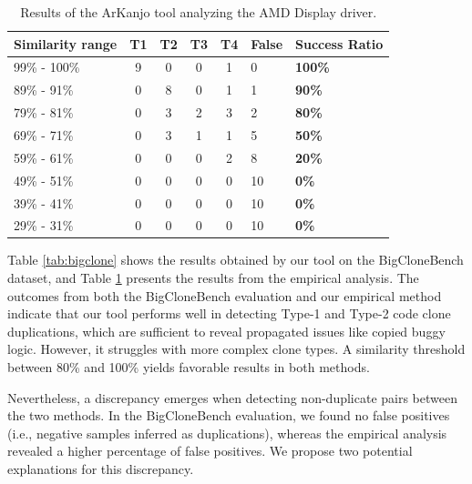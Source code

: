 \documentclass[conference]{IEEEtran}
\begin{document}
\begin{table}[ht]

\centering
\caption{Results of the ArKanjo tool analyzing the AMD Display driver.}
\begin{tabular}{ | m{15mm} | c | c | c | c | m{6mm} | m{10mm} | }

\hline

\textbf{Similarity range} & \textbf{T1} & \textbf{T2} & T3 & T4
& \textbf{False} & \textbf{Success Ratio} \\ \hline
99\% - 100\% & 9 & 0 & 0 & 1 & 0 & \textbf{100\%} \\ \hline
89\% - 91\% & 0 & 8 & 0 & 1 & 1 & \textbf{90\%} \\ \hline
79\% - 81\% & 0 & 3 & 2 & 3 & 2 & \textbf{80\%} \\ \hline
69\% - 71\% & 0 & 3 & 1 & 1 & 5 & \textbf{50\%} \\ \hline
59\% - 61\% & 0 & 0 & 0 & 2 & 8 & \textbf{20\%} \\ \hline
49\% - 51\% & 0 & 0 & 0 & 0 & 10 & \textbf{0\%} \\ \hline
39\% - 41\% & 0 & 0 & 0 & 0 & 10 & \textbf{0\%} \\ \hline
29\% - 31\% & 0 & 0 & 0 & 0 & 10 & \textbf{0\%} \\ \hline

\hline

\end{tabular}

\label{tab:emp}

\end{table}

Table \ref{tab:bigclone} shows the results obtained by our tool on the BigCloneBench dataset,
and Table \ref{tab:emp} presents the results from the empirical analysis.
The outcomes from both the BigCloneBench evaluation and our empirical method indicate that
our tool performs well in detecting Type-1 and Type-2 code clone duplications,
which are sufficient to reveal propagated issues like copied buggy logic.
However, it struggles with more complex clone types. A similarity threshold between 80\% and 100\% 
yields favorable results in both methods.

Nevertheless, a discrepancy emerges when detecting non-duplicate pairs between
the two methods. In the BigCloneBench evaluation, we found no false positives (i.e., negative
samples inferred as duplications), whereas the empirical analysis revealed a higher percentage
of false positives. We propose two potential explanations for this discrepancy.
\end{document}
